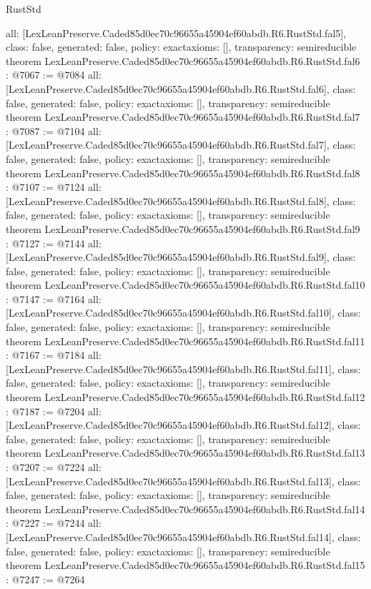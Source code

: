 \begin{lexlean}{RustStd}
\begin{coremodule}
{  all: [LexLeanPreserve.Caded85d0ec70c96655a45904ef60abdb.R6.RustStd.fal5],
  class: false,
  generated: false,
  policy: exact{axioms: []},
  transparency: semireducible
}
theorem LexLeanPreserve.Caded85d0ec70c96655a45904ef60abdb.R6.RustStd.fal6 : @7067 := @7084 {
  all: [LexLeanPreserve.Caded85d0ec70c96655a45904ef60abdb.R6.RustStd.fal6],
  class: false,
  generated: false,
  policy: exact{axioms: []},
  transparency: semireducible
}
theorem LexLeanPreserve.Caded85d0ec70c96655a45904ef60abdb.R6.RustStd.fal7 : @7087 := @7104 {
  all: [LexLeanPreserve.Caded85d0ec70c96655a45904ef60abdb.R6.RustStd.fal7],
  class: false,
  generated: false,
  policy: exact{axioms: []},
  transparency: semireducible
}
theorem LexLeanPreserve.Caded85d0ec70c96655a45904ef60abdb.R6.RustStd.fal8 : @7107 := @7124 {
  all: [LexLeanPreserve.Caded85d0ec70c96655a45904ef60abdb.R6.RustStd.fal8],
  class: false,
  generated: false,
  policy: exact{axioms: []},
  transparency: semireducible
}
theorem LexLeanPreserve.Caded85d0ec70c96655a45904ef60abdb.R6.RustStd.fal9 : @7127 := @7144 {
  all: [LexLeanPreserve.Caded85d0ec70c96655a45904ef60abdb.R6.RustStd.fal9],
  class: false,
  generated: false,
  policy: exact{axioms: []},
  transparency: semireducible
}
theorem LexLeanPreserve.Caded85d0ec70c96655a45904ef60abdb.R6.RustStd.fal10 : @7147 := @7164 {
  all: [LexLeanPreserve.Caded85d0ec70c96655a45904ef60abdb.R6.RustStd.fal10],
  class: false,
  generated: false,
  policy: exact{axioms: []},
  transparency: semireducible
}
theorem LexLeanPreserve.Caded85d0ec70c96655a45904ef60abdb.R6.RustStd.fal11 : @7167 := @7184 {
  all: [LexLeanPreserve.Caded85d0ec70c96655a45904ef60abdb.R6.RustStd.fal11],
  class: false,
  generated: false,
  policy: exact{axioms: []},
  transparency: semireducible
}
theorem LexLeanPreserve.Caded85d0ec70c96655a45904ef60abdb.R6.RustStd.fal12 : @7187 := @7204 {
  all: [LexLeanPreserve.Caded85d0ec70c96655a45904ef60abdb.R6.RustStd.fal12],
  class: false,
  generated: false,
  policy: exact{axioms: []},
  transparency: semireducible
}
theorem LexLeanPreserve.Caded85d0ec70c96655a45904ef60abdb.R6.RustStd.fal13 : @7207 := @7224 {
  all: [LexLeanPreserve.Caded85d0ec70c96655a45904ef60abdb.R6.RustStd.fal13],
  class: false,
  generated: false,
  policy: exact{axioms: []},
  transparency: semireducible
}
theorem LexLeanPreserve.Caded85d0ec70c96655a45904ef60abdb.R6.RustStd.fal14 : @7227 := @7244 {
  all: [LexLeanPreserve.Caded85d0ec70c96655a45904ef60abdb.R6.RustStd.fal14],
  class: false,
  generated: false,
  policy: exact{axioms: []},
  transparency: semireducible
}
theorem LexLeanPreserve.Caded85d0ec70c96655a45904ef60abdb.R6.RustStd.fal15 : @7247 := @7264 {
}
\end{coremodule}
\end{lexlean}
